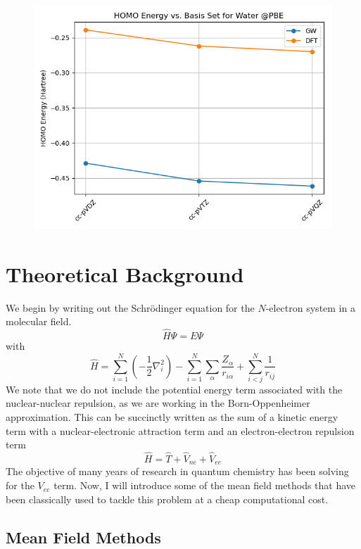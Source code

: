 \documentclass[12pt]{caltech_thesis}
\begin{document}
\begin{figure}[h]
    \centering
    \includegraphics[width=\textwidth]{water_gw.png}
\end{figure}


\chapter{Theoretical Background}
We begin by writing out the Schrödinger equation for the $N$-electron system in a molecular field. 
\begin{equation}
    \hat{H}\Psi =E\Psi 
\end{equation}
with
\begin{equation}
\hat{H}=\sum_{i=1}^N\left(-\frac{1}{2} \nabla_i^2\right)-\sum_{i=1}^N \sum_{\alpha }\frac{Z_{\alpha }}{r_{i\alpha }}+\sum_{i<j}^N \frac{1}{r_{i j}}
\end{equation}
We note that we do not include the potential energy term associated with the nuclear-nuclear repulsion, as we are working in the Born-Oppenheimer approximation. This can be succinctly written as the sum of a kinetic energy term with a nuclear-electronic attraction term and an electron-electron repulsion term  
\begin{equation}
    \hat{H}= \hat{T}+ \hat{V}_{ne}+\hat{V}_{ee}
\end{equation}
The objective of many years of research in quantum chemistry has been solving for the $V_{ee}$ term. Now, I will introduce some of the mean field methods that have been classically used to tackle this problem at a cheap computational cost.
\section{Mean Field Methods}
\end{document}
